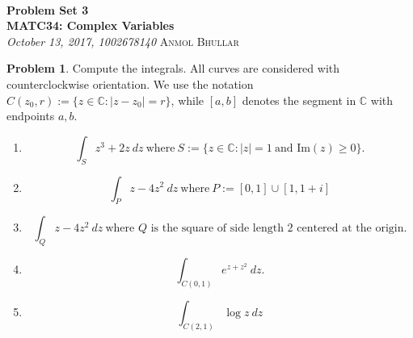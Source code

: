 \documentclass[12pt]{article}
\newcommand{\abs}[1]{\left| #1 \right|} %
\renewcommand{\=}[1]{\stackrel{#1}{=}} %
\providecommand{\CC}{\mathbb{C}}
\theoremstyle{definition}
\newtheorem{p}{Problem}[section]
\theoremstyle{definition}
\begin{document}
{\noindent\Huge\bf  \\[0.5\baselineskip] {\selectfont  %
Problem Set 3}         }\\[2\baselineskip] %
{ {\bf {}\selectfont MATC34: Complex Variables}\\ {\textit{%
\selectfont October 13, 2017, 1002678140}}}
{\large \textsc{Anmol Bhullar}} %
\\[1.4\baselineskip]

\begin{p}
    Compute the integrals. All curves are considered with counterclockwise orientation. We use the notation
    $C(z_0,r) := \{z\in\CC: \abs{z-z_0} = r\}$, while $[a,b]$ denotes the segment in $\CC$ with endpoints $a,b$.
    \begin{enumerate}
        \item \[ \int_S z^3+2z\:dz\: \text{where}\: S := \{z\in\CC: \abs{z}=1\: \text{and Im}(z)\geq 0\}. \]
        \item \[ \int_P z-4z^2\:dz\: \text{where}\: P := [0,1] \cup [1,1+i] \]
        \item \[ \int_Q z-4z^2\:dz\: \text{where $Q$ is the square of side length 2 centered at the origin.} \]
        \item \[ \int_{C(0,1)} e^{z+z^2}\:dz. \]
        \item \[ \int_{C(2,1)} \log{z}\:dz \]
    \end{enumerate}
\end{p}
\end{document}
